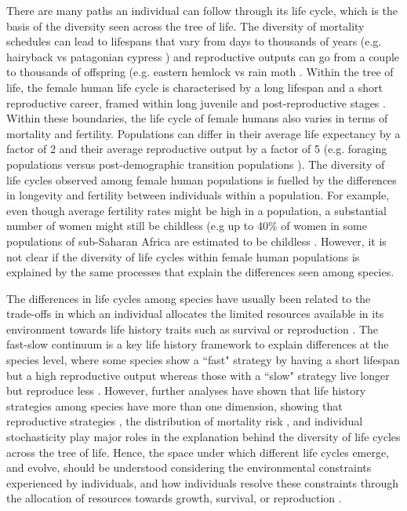 \documentclass{article}
\begin{document}
There are many paths an individual can follow through its life cycle, which is the basis of the diversity seen across the tree of life. The diversity of mortality schedules can lead to lifespans that vary from days to thousands of years (e.g. hairyback vs patagonian cypress \citep{balsamo1988life,lara19933620}) and reproductive outputs can go from a couple to thousands of offspring (e.g. eastern hemlock vs rain moth \citep{tindale1932revision,van2017lifetime}. Within the tree of life, the female human life cycle is characterised by a long lifespan and a short reproductive career, framed within long juvenile and post-reproductive stages \citep{kaplan2000theory}. Within these boundaries, the life cycle of female humans also varies in terms of mortality and fertility. Populations can differ in their average life expectancy by a factor of 2 and their average reproductive output by a factor of 5 (e.g. foraging populations \citep{migliano2007life} versus post-demographic transition populations \citep{de2017maximum}). The diversity of life cycles observed among female human populations is fuelled by the differences in longevity and fertility between individuals within a population. For example, even though average fertility rates might be high in a population, a substantial number of women might still be childless (e.g up to 40\% of women in some populations of sub-Saharan Africa are estimated to be childless \citep{bailey1995sexuality,belsey1976epidemiology}. However, it is not clear if the diversity of life cycles within female human populations is explained by the same processes that explain the differences seen among species. 

The differences in life cycles among species have usually been related to the trade-offs in which an individual allocates the limited resources available in its environment towards life history traits such as survival or reproduction \citep{stearns2000life}. The fast-slow continuum is a key life history framework to explain differences at the species level, where some species show a ``fast" strategy by having a short lifespan but a high reproductive output whereas those with a ``slow" strategy live longer but reproduce less \citep{stearns1983influence}. However, further analyses have shown that life history strategies among species have more than one dimension, showing that reproductive strategies \citep{salguero2016fast}, the distribution of mortality risk \citep{healy2019animal}, and individual stochasticity \citep{varas2022individual} play major roles in the explanation behind the diversity of life cycles across the tree of life. Hence, the space under which different life cycles emerge, and evolve, should be understood considering the environmental constraints experienced by individuals, and how individuals resolve these constraints through the allocation of resources towards growth, survival, or reproduction \citep{white2022metabolic}.
\end{document}
